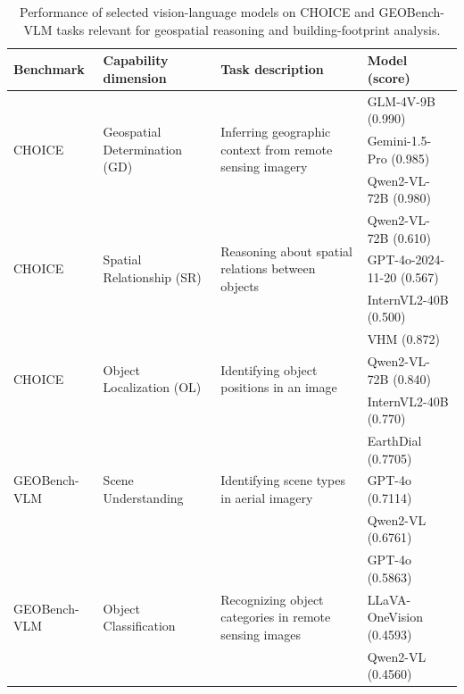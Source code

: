 \begin{table}[htb]
\centering
\caption{Performance of selected vision-language models on CHOICE and GEOBench-VLM tasks relevant for geospatial reasoning and building-footprint analysis.}
\label{tab:choice_results}
\footnotesize
\setlength{\tabcolsep}{3pt}
\renewcommand{\arraystretch}{1.15}
\begin{tabularx}{\textwidth}{
p{}
p{}
X
p{}
}
\toprule
\textbf{Benchmark} &
\textbf{Capability dimension} &
\textbf{Task description} &
\textbf{Model (score)} \\
\midrule

\multirow{3}{=}{CHOICE}
& \multirow{3}{=}{Geospatial Determination (GD)}
& \multirow{3}{=}{Inferring geographic context from remote sensing imagery}
& GLM-4V-9B (0.990) \\
& & & Gemini-1.5-Pro (0.985) \\
& & & Qwen2-VL-72B (0.980) \\

\midrule

\multirow{3}{=}{CHOICE}
& \multirow{3}{=}{Spatial Relationship (SR)}
& \multirow{3}{=}{Reasoning about spatial relations between objects}
& Qwen2-VL-72B (0.610) \\
& & & GPT-4o-2024-11-20 (0.567) \\
& & & InternVL2-40B (0.500) \\

\midrule

\multirow{3}{=}{CHOICE}
& \multirow{3}{=}{Object Localization (OL)}
& \multirow{3}{=}{Identifying object positions in an image}
& VHM (0.872) \\
& & & Qwen2-VL-72B (0.840) \\
& & & InternVL2-40B (0.770) \\

\midrule

\multirow{3}{=}{GEOBench-VLM}
& \multirow{3}{=}{Scene Understanding}
& \multirow{3}{=}{Identifying scene types in aerial imagery}
& EarthDial (0.7705) \\
& & & GPT-4o (0.7114) \\
& & & Qwen2-VL (0.6761) \\

\midrule

\multirow{3}{=}{GEOBench-VLM}
& \multirow{3}{=}{Object Classification}
& \multirow{3}{=}{Recognizing object categories in remote sensing images}
& GPT-4o (0.5863) \\
& & & LLaVA-OneVision (0.4593) \\
& & & Qwen2-VL (0.4560) \\


\end{tabularx}
\end{table}
